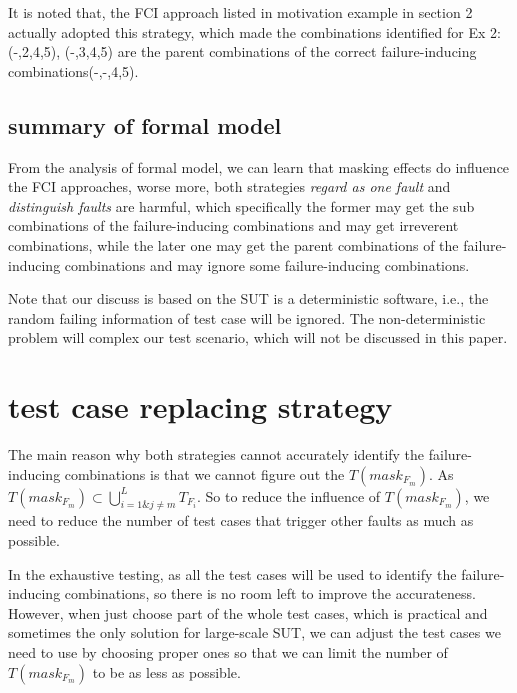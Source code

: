 \documentclass{sig-alternate}
\begin{document}
It is noted that, the FCI approach listed in motivation example in section 2 actually adopted this strategy, which made the combinations identified for Ex 2: (-,2,4,5), (-,3,4,5) are the parent combinations of the correct failure-inducing combinations(-,-,4,5).

\subsection{summary of formal model}
From the analysis of formal model, we can learn that masking effects do influence the FCI approaches, worse more, both strategies \emph{regard as one fault} and \emph{distinguish faults} are harmful, which specifically the former may get the sub combinations of the failure-inducing combinations and may get irreverent combinations, while the later one may get the parent combinations of the failure-inducing combinations and may ignore some failure-inducing combinations.

Note that our discuss is based on the SUT is a deterministic software, i.e., the random failing information of test case will be ignored. The non-deterministic problem will complex our test scenario, which will not be discussed in this paper.

\section{test case replacing strategy}
The main reason why both strategies cannot accurately identify the failure-inducing combinations is that we cannot figure out the $T(mask_{F_{m}})$.  As $T(mask_{F_{m}}) \subset \bigcup_{i = 1 \& j \neq m }^{L}T_{F_{i}}$. So to reduce the influence of $T(mask_{F_{m}})$, we need to reduce the number of test cases that trigger other faults as much as possible.

In the exhaustive testing, as all the test cases will be used to identify the failure-inducing combinations, so there is no room left to improve the accurateness. However, when just choose part of the whole test cases, which is practical and sometimes the only solution for large-scale SUT, we can adjust the test cases we need to use by choosing proper ones so that we can limit the number of $T(mask_{F_{m}})$ to  be as less as possible.

\end{document}
